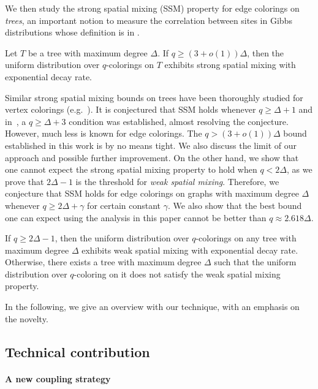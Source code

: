 \documentclass[a4paper,11pt]{article}
\begin{document}
We then study the strong spatial mixing (SSM) property for edge colorings on \emph{trees}, an important notion to measure the correlation between sites in Gibbs distributions whose definition is in .



\begin{theorem}[Informal]\label{thm:SSM-informal}
    Let $T$ be a tree with maximum degree $\Delta$. If $q\geq (3+o(1))\Delta$, then the uniform distribution over $q$-colorings on $T$ exhibits strong spatial mixing with exponential decay rate.
\end{theorem}

Similar strong spatial mixing bounds on trees have been thoroughly studied for vertex colorings (e.g.~\cite{EGHSV19,CLMM23}). It is conjectured that SSM holds whenever $q\ge \Delta+1$ and in~\cite{CLMM23}, a $q\ge \Delta+3$ condition was established, almost resolving the conjecture. However, much less is known for edge colorings. 
The $q>(3+o(1))\Delta$ bound established in this work is by no means tight. We also discuss the limit of our approach and possible further improvement. On the other hand, we show that one cannot expect the strong spatial mixing property to hold when $q<2\Delta$, as we prove that $2\Delta-1$ is the threshold for \emph{weak spatial mixing}. Therefore, we conjecture that SSM holds for edge colorings on graphs with maximum degree $\Delta$ whenever $q\ge 2\Delta+\gamma$ for certain constant $\gamma$. We also show that the best bound one can expect using the analysis in this paper cannot be better than $q\approx 2.618\Delta$.

\begin{theorem}[Informal]\label{thm:WSM-informal}
    If $q\geq 2\Delta-1$, then the uniform distribution over $q$-colorings on any tree with maximum degree $\Delta$ exhibits weak spatial mixing with exponential decay rate. Otherwise, there exists a tree with maximum degree $\Delta$ such that the uniform distribution over $q$-coloring on it does not satisfy the weak spatial mixing property.
\end{theorem}
In the following, we give an overview with our technique, with an emphasis on the novelty.

\subsection{Technical contribution}

\paragraph{A new coupling strategy}
\end{document}
